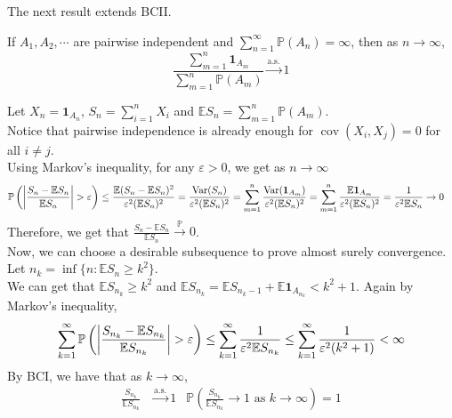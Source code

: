 \documentclass{huhtakm-template-book}
\newcommand{\prob}{\mathbb{P}}
\newcommand{\expect}{\mathbb{E}}
\DeclareMathOperator{\Var}{Var}
\DeclareMathOperator{\cov}{cov}
\begin{document}
    \newpage
    The next result extends BCII.
    \begin{thm}
        If $A_{1},A_{2},\cdots$ are pairwise independent and $\sum_{n=1}^{\infty}\prob(A_{n})=\infty$, then as $n\to\infty$,
        \begin{equation*}
            \frac{\sum_{m=1}^{n}\mathbf{1}_{A_{m}}}{\sum_{m=1}^{n}\prob(A_{m})}\xrightarrow{\text{a.s.}}1
        \end{equation*}
    \end{thm}
    \begin{proofing}
        Let $X_{n}=\mathbf{1}_{A_{n}}$, $S_{n}=\sum_{i=1}^{n}X_{i}$ and $\expect S_{n}=\sum_{m=1}^{n}\prob(A_{m})$.\\
        Notice that pairwise independence is already enough for $\cov(X_{i},X_{j})=0$ for all $i\neq j$.\\
        Using Markov's inequality, for any $\varepsilon>0$, we get as $n\to\infty$
        \begin{align*}
            \prob\left(\abs{\frac{S_{n}-\expect S_{n}}{\expect S_{n}}}>\varepsilon\right)&\leq\frac{\expect(S_{n}-\expect S_{n})^{2}}{\varepsilon^{2}(\expect S_{n})^{2}}=\frac{\Var(S_{n})}{\varepsilon^{2}(\expect S_{n})^{2}}=\sum_{m=1}^{n}\frac{\Var(\mathbf{1}_{A_{m}})}{\varepsilon^{2}(\expect S_{n})^{2}}=\sum_{m=1}^{n}\frac{\expect\mathbf{1}_{A_{m}}}{\varepsilon^{2}(\expect S_{n})^{2}}=\frac{1}{\varepsilon^{2}\expect S_{n}}\to 0
        \end{align*}
        Therefore, we get that $\frac{S_{n}-\expect S_{n}}{\expect S_{n}}\xrightarrow{\prob}0$.\\
        Now, we can choose a desirable subsequence to prove almost surely convergence. Let $n_{k}=\inf\{n:\expect S_{n}\geq k^{2}\}$.\\
        We can get that $\expect S_{n_{k}}\geq k^{2}$ and $\expect S_{n_{k}}=\expect S_{n_{k}-1}+\expect\mathbf{1}_{A_{n_{k}}}<k^{2}+1$. Again by Markov's inequality,
        \begin{equation*}
            \sum_{k=1}^{\infty}\prob\left(\abs{\frac{S_{n_{k}}-\expect S_{n_{k}}}{\expect S_{n_{k}}}}>\varepsilon\right)\leq\sum_{k=1}^{\infty}\frac{1}{\varepsilon^{2}\expect S_{n_{k}}}\leq\sum_{k=1}^{\infty}\frac{1}{\varepsilon^{2}(k^{2}+1)}<\infty
        \end{equation*}
        By BCI, we have that as $k\to\infty$,
        \begin{align*}
            \frac{S_{n_{k}}}{\expect S_{n_{k}}}&\xrightarrow{\text{a.s.}}1 & \prob\left(\frac{S_{n_{k}}}{\expect S_{n_{k}}}\to 1\text{ as }k\to\infty\right)=1

\end{align*}
\end{proofing}
\end{document}
